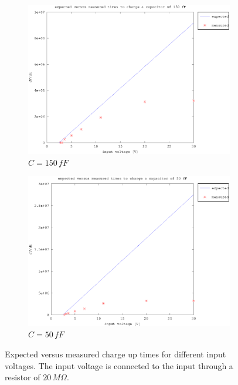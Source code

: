 \documentclass{article}
\begin{document}
\begin{figure}[h]
\begin{subfigure}[b]{0.475\textwidth}
	    \centering 
	    \includegraphics[width=\textwidth]{fig/vin_vs_time_sat_150fF.eps}
	    \caption[]%
	    {$C=150\,fF$}    
	    \label{fig:e_vs_m_150fF}
	\end{subfigure}
	\quad
	\begin{subfigure}[b]{0.475\textwidth}   
	    \centering 
	    \includegraphics[width=\textwidth]{fig/vin_vs_time_sat_50fF.eps}
	    \caption[]%
	    {$C=50\,fF$}    
	    \label{fig:e_vs_m_50fF}
	\end{subfigure}
	\caption{Expected versus measured charge up times for different input voltages. The input voltage is connected to the input through a resistor of $20\,M\Omega$.}
	\label{fig:e_vs_m}
\end{figure}
\end{document}

